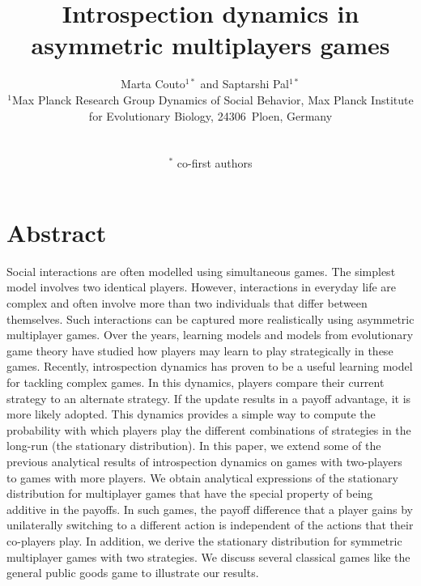 \documentclass[11pt]{article}
\title{\sffamily \Large {\bfseries Introspection dynamics in asymmetric multiplayers games}}
\date{\empty}
\author{\parbox[c]{16cm}{\centering \onehalfspacing \fontsize{11}{12}\selectfont Marta Couto$^{1*}$ and Saptarshi Pal$^{1*}$\\[0.2cm]
$^1$Max Planck Research Group Dynamics of Social Behavior, Max Planck Institute for Evolutionary Biology, 24306~Ploen, Germany}\\ \\
$^*$ \fontsize{11}{12}\selectfont co-first authors}
\theoremstyle{plainCl1}
\theoremstyle{plainCl2}
\begin{document}
\maketitle
\onehalfspacing
\section*{Abstract}


Social interactions are often modelled using simultaneous games. The simplest model involves two identical players. However, interactions in everyday life are complex and often involve more than two individuals that differ between themselves. Such interactions can be captured more realistically using asymmetric multiplayer games. Over the years, learning models and models from evolutionary game theory have studied how players may learn to play strategically in these games. Recently, introspection dynamics has proven to be a useful learning model for tackling complex games. In this dynamics, players compare their current strategy to an alternate strategy. If the update results in a payoff advantage, it is more likely adopted. This dynamics provides a simple way to compute the probability with which players play the different combinations of strategies in the long-run (the stationary distribution). In this paper, we extend some of the previous analytical results of introspection dynamics on games with two-players to games with more players. We obtain analytical expressions of the stationary distribution for multiplayer games that have the special property of being additive in the payoffs. In such games, the payoff difference that a player gains by unilaterally switching to a different action is independent of the actions that their co-players play. In addition, we derive the stationary distribution for symmetric multiplayer games with two strategies. We discuss several classical games like the general public goods game to illustrate our results. 
\end{document}
